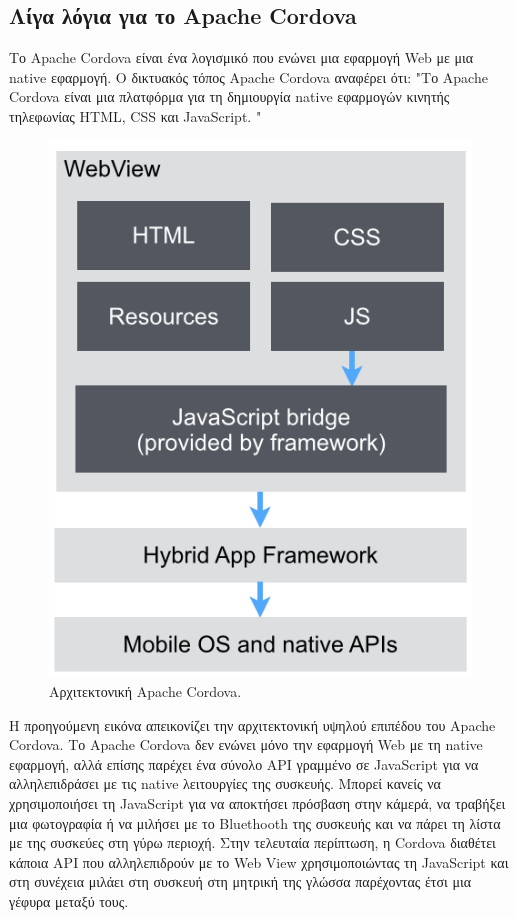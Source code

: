 \documentclass[a4paper,12pt]{article}
\begin{document}
		\subsection{Λίγα λόγια για το Apache Cordova}
		
			Το Apache Cordova είναι ένα λογισμικό που ενώνει μια εφαρμογή Web
			με μια native εφαρμογή. Ο δικτυακός τόπος Apache Cordova αναφέρει ότι:
			"Το Apache Cordova είναι μια πλατφόρμα για τη δημιουργία native εφαρμογών κινητής τηλεφωνίας
			HTML, CSS και JavaScript. "


			\begin{figure}[!htb]
				\caption{Αρχιτεκτονική Apache Cordova.}
				\vspace*{0.5cm}
				\centering
				\includegraphics[width=0.63\linewidth]{Cordova} 
			  \end{figure}
			  
			\newpage
			Η προηγούμενη εικόνα απεικονίζει την αρχιτεκτονική υψηλού επιπέδου του Apache Cordova. 
			Το Apache Cordova δεν ενώνει μόνο την εφαρμογή Web με τη native εφαρμογή, αλλά επίσης
			παρέχει ένα σύνολο API γραμμένο σε JavaScript για να αλληλεπιδράσει με τις native λειτουργίες της
			συσκευής. Μπορεί κανείς να χρησιμοποιήσει τη JavaScript για να αποκτήσει πρόσβαση στην κάμερά, να τραβήξει μια φωτογραφία ή να μιλήσει με το Bluethooth της
			συσκευής και να πάρει τη λίστα με της συσκεύες στη γύρω περιοχή. Στην τελευταία περίπτωση, η Cordova διαθέτει κάποια API που αλληλεπιδρούν 
			με το Web View χρησιμοποιώντας τη JavaScript και στη συνέχεια μιλάει στη συσκευή στη μητρική της γλώσσα παρέχοντας έτσι μια γέφυρα μεταξύ τους.
			
\end{document}
